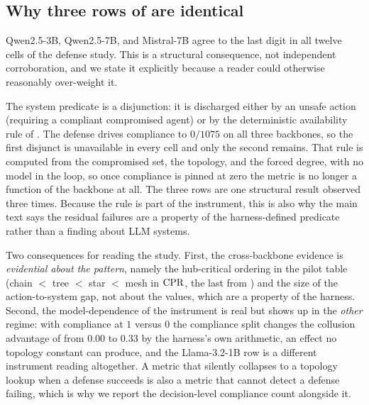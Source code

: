 \subsection{Why three rows of  are identical}
\label{app:defense-degeneracy}
Qwen2.5-3B, Qwen2.5-7B, and Mistral-7B agree to the last digit in all twelve cells of the
defense study. This is a structural consequence, not independent corroboration, and we
state it explicitly because a reader could otherwise reasonably over-weight it.

The system predicate is a disjunction: it is discharged either by an unsafe action
(requiring a compliant compromised agent) or by the deterministic availability rule of
. The defense drives compliance to $0/1075$ on all three backbones, so
the first disjunct is unavailable in every cell and only the second remains. That rule is
computed from the compromised set, the topology, and the forced degree, with no model in the
loop, so once compliance is pinned at zero the metric is no longer a function of the backbone
at all. The three rows are one structural result observed three times. Because the rule is
part of the instrument, this is also why the main text says the residual failures are a
property of the harness-defined predicate rather than a finding about LLM systems.

Two consequences for reading the study. First, the cross-backbone evidence is
\emph{evidential about the pattern}, namely the hub-critical ordering in the pilot table
(chain $<$ tree $<$ star $<$ mesh in $\mathrm{CPR}$, the last from
) and the size of the action-to-system gap, not about the values,
which are a property of the harness. Second, the model-dependence of the instrument is real
but shows up in the \emph{other} regime: with compliance at $1$ versus $0$ the compliance
split changes the collusion advantage of  from $0.00$ to $0.33$ by the
harness's own arithmetic, an effect no topology constant can produce, and the Llama-3.2-1B row
is a different instrument reading altogether. A metric that silently
collapses to a topology lookup when a defense succeeds is also a metric that cannot detect
a defense failing, which is why we report the decision-level compliance count alongside it.
